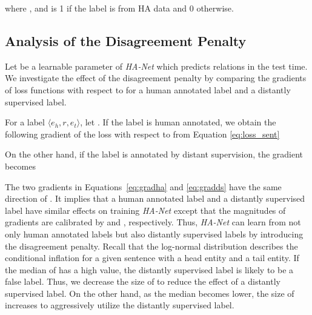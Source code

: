 \documentclass[11pt]{article}
\newcommand{\triple}[3]{\ensuremath{\langle #1,#2,#3\rangle}}
\newcommand{\hanet}{\emph{HA-Net}\xspace}
\newcommand{\ehead}{e_{h}}
\newcommand{\etail}{e_{t}}
\begin{document}
where  , and  is 1 if the label is from HA data and 0 otherwise.






























\subsection{Analysis of the Disagreement Penalty}
\label{sec:analysis}
Let  be a learnable parameter of \hanet which predicts relations in the test time.
We investigate the effect of the disagreement penalty by comparing the gradients of loss functions with respect to  for a human annotated label and a distantly supervised label.


For a label \triple{\ehead}{r}{\etail}, let .
If the label is human annotated, we obtain the following
gradient of the loss  with respect to  from Equation \eqref{eq:loss_sent}
\vspace{-0.03in}

 


On the other hand, if the label is annotated by distant supervision,
the gradient becomes
\vspace{-0.03in}



The two gradients in Equations~\eqref{eq:gradha} and \eqref{eq:gradds} have the same direction of .
It implies that a human annotated label and a distantly supervised label have similar effects on training \hanet
except that the magnitudes of gradients are calibrated by  and , respectively.
Thus, \hanet can learn from not only  human annotated labels but also distantly supervised labels by introducing the disagreement penalty.
Recall that the log-normal distribution  describes the conditional inflation for a given sentence with a head entity and a tail entity.
If the median  of  has a high value, the distantly supervised label is likely to be a false label. 
Thus, we decrease the size of  to reduce the effect of a distantly supervised label.
On the other hand, as the median  becomes lower, the size of  increases to aggressively utilize the distantly supervised label.
\end{document}
